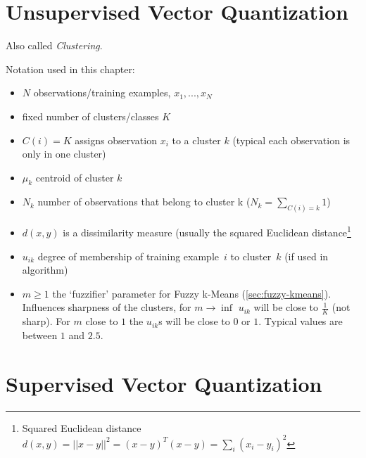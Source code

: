 \chapter{Unsupervised Vector Quantization}\label{chapter:clustering}
Also called \emph{Clustering}.

Notation used in this chapter:
\begin{itemize}
\item $N$ observations/training examples, $x_1, ..., x_N$
\item fixed number of clusters/classes $K$
\item $C(i) = K$ assigns observation $x_i$ to a cluster $k$ (typical each observation is only in one cluster)
\item $\mu_k$ centroid of cluster $k$
\item $N_k$ number of observations that belong to cluster k ($N_k = \sum\limits_{C(i)=k} 1$)
\item $d(x, y)$ is a dissimilarity measure (usually the squared Euclidean distance\footnote{Squared Euclidean distance $d(x, y) = ||x-y||^2 = (x-y)^T (x-y) = \sum_i (x_i-y_i)^2$}
\item $u_{ik}$ degree of membership of training example~$i$ to cluster~$k$ (if used in algorithm)
\item $m \geq 1$ the `fuzzifier' parameter for Fuzzy k-Means (\ref{sec:fuzzy-kmeans}). Influences sharpness of the clusters, for $m \to \inf$ $u_{ik}$ will be close to $\frac{1}{K}$ (not sharp). For $m$ close to $1$ the $u_{ik}$s will be close to $0$ or $1$. Typical values are between $1$ and $2.5$.
\end{itemize}





\chapter{Supervised Vector Quantization}\label{chapter:vq}





